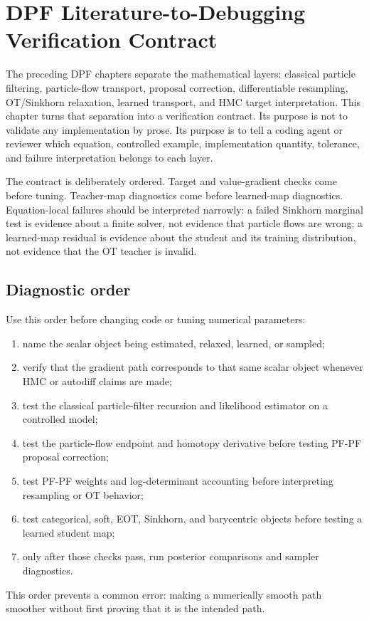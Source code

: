 \chapter{DPF Literature-to-Debugging Verification Contract}
\label{ch:bf-dpf-debug-crosswalk}

The preceding DPF chapters separate the mathematical layers: classical
particle filtering, particle-flow transport, proposal correction,
differentiable resampling, OT/Sinkhorn relaxation, learned transport, and HMC
target interpretation.  This chapter turns that separation into a verification
contract.  Its purpose is not to validate any implementation by prose.  Its
purpose is to tell a coding agent or reviewer which equation, controlled
example, implementation quantity, tolerance, and failure interpretation belongs
to each layer.

The contract is deliberately ordered.  Target and value-gradient checks come
before tuning.  Teacher-map diagnostics come before learned-map diagnostics.
Equation-local failures should be interpreted narrowly: a failed Sinkhorn
marginal test is evidence about a finite solver, not evidence that particle
flows are wrong; a learned-map residual is evidence about the student and its
training distribution, not evidence that the OT teacher is invalid.

\section{Diagnostic order}
\label{sec:bf-dpf-debug-order}

Use this order before changing code or tuning numerical parameters:
\begin{enumerate}[label=(\arabic*)]
  \item name the scalar object being estimated, relaxed, learned, or sampled;
  \item verify that the gradient path corresponds to that same scalar object
    whenever HMC or autodiff claims are made;
  \item test the classical particle-filter recursion and likelihood estimator
    on a controlled model;
  \item test the particle-flow endpoint and homotopy derivative before testing
    PF-PF proposal correction;
  \item test PF-PF weights and log-determinant accounting before interpreting
    resampling or OT behavior;
  \item test categorical, soft, EOT, Sinkhorn, and barycentric objects before
    testing a learned student map;
  \item only after those checks pass, run posterior comparisons and sampler
    diagnostics.
\end{enumerate}
This order prevents a common error: making a numerically smooth path smoother
without first proving that it is the intended path.

